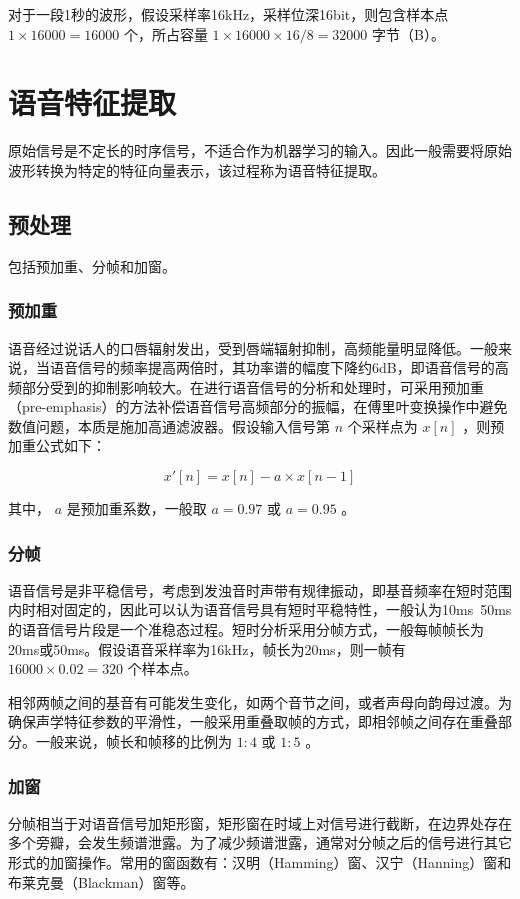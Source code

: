 \documentclass[cn,10pt,math=newtx,citestyle=gb7714-2015,bibstyle=gb7714-2015]{elegantbook}
\begin{document}
对于一段1秒的波形，假设采样率16kHz，采样位深16bit，则包含样本点 $1\times 16000=16000$ 个，所占容量 $1\times 16000\times 16 /8=32000$ 字节（B）。








\chapter{语音特征提取}
原始信号是不定长的时序信号，不适合作为机器学习的输入。因此一般需要将原始波形转换为特定的特征向量表示，该过程称为语音特征提取。

\section{预处理}
包括预加重、分帧和加窗。

\subsection{预加重}
语音经过说话人的口唇辐射发出，受到唇端辐射抑制，高频能量明显降低。一般来说，当语音信号的频率提高两倍时，其功率谱的幅度下降约6dB，即语音信号的高频部分受到的抑制影响较大。在进行语音信号的分析和处理时，可采用预加重（pre-emphasis）的方法补偿语音信号高频部分的振幅，在傅里叶变换操作中避免数值问题，本质是施加高通滤波器。假设输入信号第 $n$ 个采样点为 $x[n]$ ，则预加重公式如下：

\begin{equation}
  x'[n]=x[n]-a\times x[n-1]
\end{equation}

其中， $a$ 是预加重系数，一般取 $a=0.97$ 或 $a=0.95$ 。

\subsection{分帧}
语音信号是非平稳信号，考虑到发浊音时声带有规律振动，即基音频率在短时范围内时相对固定的，因此可以认为语音信号具有短时平稳特性，一般认为10ms~50ms的语音信号片段是一个准稳态过程。短时分析采用分帧方式，一般每帧帧长为20ms或50ms。假设语音采样率为16kHz，帧长为20ms，则一帧有 $16000\times 0.02=320$ 个样本点。

相邻两帧之间的基音有可能发生变化，如两个音节之间，或者声母向韵母过渡。为确保声学特征参数的平滑性，一般采用重叠取帧的方式，即相邻帧之间存在重叠部分。一般来说，帧长和帧移的比例为 $1:4$ 或 $1:5$ 。

\subsection{加窗}
分帧相当于对语音信号加矩形窗，矩形窗在时域上对信号进行截断，在边界处存在多个旁瓣，会发生频谱泄露。为了减少频谱泄露，通常对分帧之后的信号进行其它形式的加窗操作。常用的窗函数有：汉明（Hamming）窗、汉宁（Hanning）窗和布莱克曼（Blackman）窗等。
\end{document}
